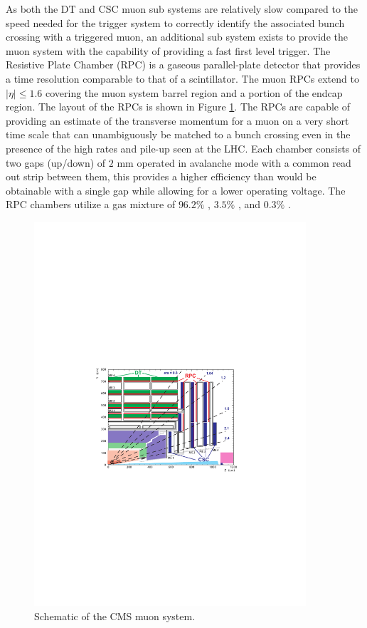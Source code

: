 As both the DT and CSC muon sub systems are relatively slow compared to the speed needed for the trigger system to correctly identify the associated bunch crossing with a triggered muon, an additional sub system exists to provide the muon system with the capability of providing a fast first level trigger.
The Resistive Plate Chamber (RPC) is a gaseous parallel-plate detector that provides a time resolution comparable to that of a scintillator\cite{RPC}.
The muon RPCs extend to $|\eta| \le 1.6$ covering the muon system barrel region and a portion of the endcap region. 
The layout of the RPCs is shown in Figure \ref{fig:rpclayout}.
The RPCs are capable of providing an estimate of the transverse momentum for a muon on a very short time scale that can unambiguously be matched to a bunch crossing even in the presence of the high rates and pile-up seen at the LHC.
Each chamber consists of two gaps (up/down) of $2$ mm operated in avalanche mode with a common read out strip between them, this provides a higher efficiency than would be obtainable with a single gap while allowing for a lower operating voltage. %
The RPC chambers utilize a gas mixture of $96.2\%$ , $3.5\%$ , and $0.3\%$ .
\begin{figure}[htpb]
\begin{center}
\includegraphics[width=0.9\textwidth]{plots/rpclayout.pdf}
\caption{Schematic of the CMS muon system\cite{TDR}.}
\label{fig:rpclayout}
\end{center}
\end{figure}


